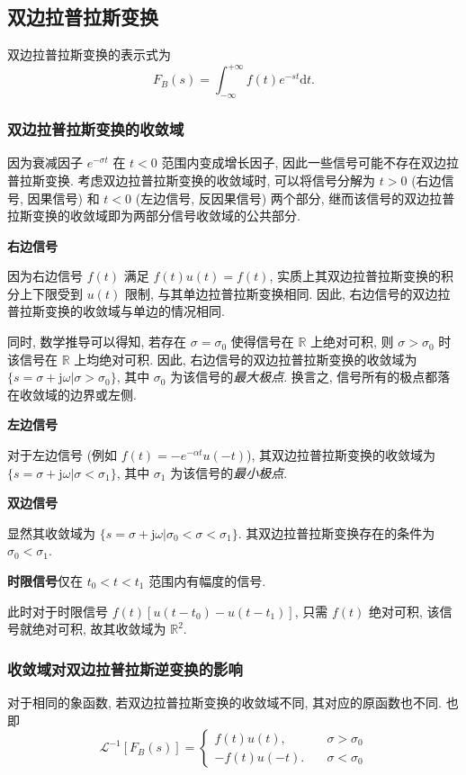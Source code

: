 \subsection{双边拉普拉斯变换} \label{4 双边拉普拉斯变换}
双边拉普拉斯变换的表示式为
\begin{equation}
    F_B(s)=\int_{-\infty}^{+\infty}f(t)e^{-st}\mathrm{d}t.
\end{equation}

\subsubsection{双边拉普拉斯变换的收敛域}
因为衰减因子 $e^{-\sigma t}$ 在 $t<0$ 范围内变成增长因子, 因此一些信号可能不存在双边拉普拉斯变换. 考虑双边拉普拉斯变换的收敛域时, 可以将信号分解为 $t>0$ (右边信号, 因果信号) 和 $t<0$ (左边信号, 反因果信号) 两个部分, 继而该信号的双边拉普拉斯变换的收敛域即为两部分信号收敛域的公共部分.

\textbf{右边信号}

因为右边信号 $f(t)$ 满足 $f(t)u(t)=f(t)$, 实质上其双边拉普拉斯变换的积分上下限受到 $u(t)$ 限制, 与其单边拉普拉斯变换相同. 因此, 右边信号的双边拉普拉斯变换的收敛域与单边的情况相同.

同时, 数学推导可以得知, 若存在 $\sigma=\sigma_0$ 使得信号在 $\mathbb{R}$ 上绝对可积, 则 $\sigma>\sigma_0$ 时该信号在 $\mathbb{R}$ 上均绝对可积. 因此, 右边信号的双边拉普拉斯变换的收敛域为 $\{s=\sigma+\mathrm{j}\omega|\sigma>\sigma_0\}$, 其中 $\sigma_0$ 为该信号的\textit{最大极点}. 换言之, 信号所有的极点都落在收敛域的边界或左侧.

\textbf{左边信号}

对于左边信号 (例如 $f(t)=-e^{-\alpha t}u(-t)$), 其双边拉普拉斯变换的收敛域为 $\{s=\sigma+\mathrm{j}\omega|\sigma<\sigma_1\}$, 其中 $\sigma_1$ 为该信号的\textit{最小极点}.

\textbf{双边信号}

显然其收敛域为 $\{s=\sigma+\mathrm{j}\omega|\sigma_0<\sigma<\sigma_1\}$. 其双边拉普拉斯变换存在的条件为 $\sigma_0<\sigma_1$.

\textbf{时限信号}\quad 仅在 $t_0<t<t_1$ 范围内有幅度的信号.

此时对于时限信号 $f(t)[u(t-t_0)-u(t-t_1)]$, 只需 $f(t)$ 绝对可积, 该信号就绝对可积, 故其收敛域为 $\mathbb{R}^2$.

\subsubsection{收敛域对双边拉普拉斯逆变换的影响}
对于相同的象函数, 若双边拉普拉斯变换的收敛域不同, 其对应的原函数也不同. 也即
\begin{equation}
    \mathcal{L}^{-1}[F_B(s)]=\begin{cases}
        f(t)u(t),   & \quad \sigma>\sigma_0 \\
        -f(t)u(-t). & \quad \sigma<\sigma_0
    \end{cases}
\end{equation}

